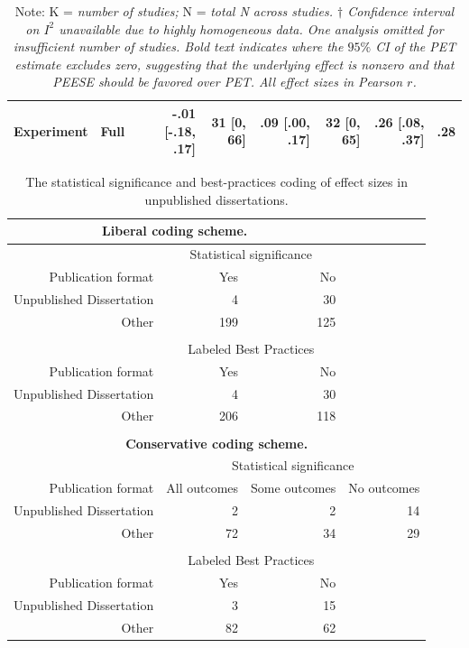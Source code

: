 \documentclass[jou]{apa6}
\begin{document}
\begin{table}[htbp]
\begin{tabular}{rrrrrrrr}
		Experiment & Full  & -.01 [-.18, .17] & 31 [0, 66] & .09 [.00, .17] & 32 [0, 65] & .26 [.08, .37] & .28 \\
		\bottomrule
	\end{tabular}%
	\label{table:adjustment}%
	\caption*{Note: K = {\em number of studies;} N = {\em total N across studies. $\dagger$ Confidence interval on $I^2$ unavailable due to highly homogeneous data. One analysis omitted for insufficient number of studies. Bold text indicates where the $95\%$ CI of the PET estimate excludes zero, suggesting that the underlying effect is nonzero and that PEESE should be favored over PET. All effect sizes in Pearson $r$.}}
\end{table}%

\begin{table}[htbp]
	\small
	\centering
	\caption{The statistical significance and best-practices coding of effect sizes in unpublished dissertations.}
	\begin{tabular}{rrrr}
		\toprule
		\multicolumn{3}{c}{\textbf{Liberal coding scheme.}} &  \\
		\midrule
		& \multicolumn{2}{c}{Statistical significance} &  \\
		Publication format & Yes   & No    &  \\
		Unpublished Dissertation & 4     & 30    &  \\
		Other & 199   & 125   &  \\
		&       &       &  \\
		& \multicolumn{2}{c}{Labeled Best Practices} &  \\
		Publication format & Yes   & No    &  \\
		Unpublished Dissertation & 4     & 30    &  \\
		Other & 206   & 118   &  \\
		&       &       &  \\
		\multicolumn{4}{c}{\textbf{Conservative coding scheme.}} \\
		& \multicolumn{3}{c}{Statistical significance} \\
		Publication format & All outcomes   & Some outcomes & No outcomes \\
		Unpublished Dissertation & 2     & 2     & 14 \\
		Other & 72    & 34    & 29 \\
		&       &       &  \\
		& \multicolumn{2}{c}{Labeled Best Practices} &  \\
		Publication format & Yes   & No    &  \\
		Unpublished Dissertation & 3     & 15    &  \\
		Other & 82    & 62    &  \\
		\bottomrule
	\end{tabular}%
	\label{table:dissertations}%
\end{table}
\end{document}

